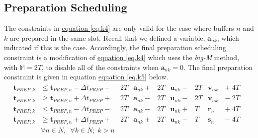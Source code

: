 \subsection{Preparation Scheduling}\label{SS.prepsched}
The constraints in \hyperref[eq.k4]{equation \ref*{eq.k4}} are only valid for
the case where buffers $n$ and $k$ are prepared in the same slot.
Recall that we defined a variable, $\boldsymbol{a}_{nk}$, which indicated if
this is the case.
Accordingly, the final preparation scheduling constraint is a modification of
\hyperref[eq.k4]{equation \ref*{eq.k4}} which uses the \emph{big-M} method,
with $\mathbb{M} = 2T$, to disable all of the constraints when
$\boldsymbol{a}_{nk} = 0$.
The final preparation constraint is given in equation
\hyperref[eq.k5]{equation \ref*{eq.k5}} below. 
\begin{equation}
    \begin{split}
        \begin{alignedat}{14}
            \boldsymbol{t}_{\mathit{PREP},k}
            &\le \boldsymbol{t}_{\mathit{PREP},n}
            - \Delta t_{\mathit{PREP}} {}-{} & 2T &\boldsymbol{a}_{nk}
            {}+{} & 2T &\boldsymbol{u}_{nk}
            {}-{} & 2T &\boldsymbol{v}_{nk} & {}+{} 4T&\\
            \boldsymbol{t}_{\mathit{PREP},k}
            &\ge \boldsymbol{t}_{\mathit{PREP},n}
            + \Delta t_{\mathit{PREP}} {}+{} & 2T &\boldsymbol{a}_{nk}
            {}-{} & 2T &\boldsymbol{u}_{nk}
            {}-{} & 2T &\boldsymbol{v}_{nk} & {}-{} 2T&\\
            \boldsymbol{t}_{\mathit{PREP},k}
            &\le \boldsymbol{t}_{\mathit{PREP},n}
            - \Delta t_{\mathit{PREP}} {}-{} & 2T &\boldsymbol{a}_{nk}
            {}-{} & 2T &\boldsymbol{u}_{nk}
            {}+{} & T &\boldsymbol{r}_{n} & {}+{} 4T&\\
            \boldsymbol{t}_{\mathit{PREP},k}
            &\ge \boldsymbol{t}_{\mathit{PREP},n}
            + \Delta t_{\mathit{PREP}} {}+{} & 2T &\boldsymbol{a}_{nk}
            {}+{} & 2T &\boldsymbol{u}_{nk}
            {}-{} & T &\boldsymbol{s}_{n} & {}-{} 4T&\\
            &\forall n \in N, \enspace \forall k \in N; \; k > n
            \end{alignedat}            
    \end{split}
    \label{eq.k5}
\end{equation}









